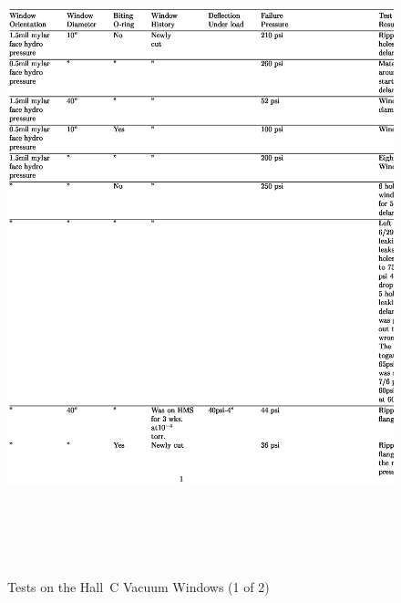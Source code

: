 {{\begin{figure}
\includegraphics[height=7.5in]{vacuum}
\caption{Tests on the Hall~C Vacuum Windows (1 of 2) \label{tab:win_tst1}} 
\end{figure}
\clearpage

}}
